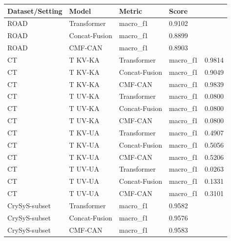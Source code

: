 \begin{tabular}{llll}
\toprule
Dataset/Setting & Model & Metric & Score \\
\midrule
ROAD & Transformer & macro_f1 & 0.9102 \\
ROAD & Concat-Fusion & macro_f1 & 0.8899 \\
ROAD & CMF-CAN & macro_f1 & 0.8903 \\
CT&T KV-KA & Transformer & macro_f1 & 0.9814 \\
CT&T KV-KA & Concat-Fusion & macro_f1 & 0.9049 \\
CT&T KV-KA & CMF-CAN & macro_f1 & 0.9839 \\
CT&T UV-KA & Transformer & macro_f1 & 0.0800 \\
CT&T UV-KA & Concat-Fusion & macro_f1 & 0.0800 \\
CT&T UV-KA & CMF-CAN & macro_f1 & 0.0800 \\
CT&T KV-UA & Transformer & macro_f1 & 0.4907 \\
CT&T KV-UA & Concat-Fusion & macro_f1 & 0.5056 \\
CT&T KV-UA & CMF-CAN & macro_f1 & 0.5206 \\
CT&T UV-UA & Transformer & macro_f1 & 0.0263 \\
CT&T UV-UA & Concat-Fusion & macro_f1 & 0.1331 \\
CT&T UV-UA & CMF-CAN & macro_f1 & 0.3101 \\
CrySyS-subset & Transformer & macro_f1 & 0.9582 \\
CrySyS-subset & Concat-Fusion & macro_f1 & 0.9576 \\
CrySyS-subset & CMF-CAN & macro_f1 & 0.9583 \\
\bottomrule
\end{tabular}
